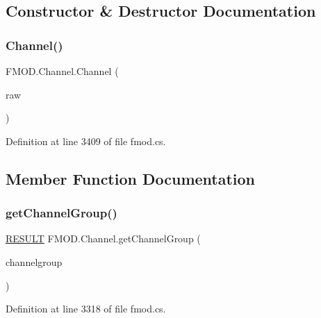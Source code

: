 \subsection{Constructor \& Destructor Documentation}
\mbox{\label{class_f_m_o_d_1_1_channel_a48f307ca43520fbdcc11a616507d6fde}} 
\subsubsection{\texorpdfstring{Channel()}{Channel()}}
{\footnotesize\ttfamily F\+M\+O\+D.\+Channel.\+Channel (\begin{DoxyParamCaption}\item[{Int\+Ptr}]{raw }\end{DoxyParamCaption})}



Definition at line 3409 of file fmod.\+cs.



\subsection{Member Function Documentation}
\mbox{\label{class_f_m_o_d_1_1_channel_a6090d298a16a30059959c2e62939ba25}} 
\subsubsection{\texorpdfstring{get\+Channel\+Group()}{getChannelGroup()}}
{\footnotesize\ttfamily \hyperlink{namespace_f_m_o_d_a305d1176ef3f8c8815861a60407ac33d}{R\+E\+S\+U\+LT} F\+M\+O\+D.\+Channel.\+get\+Channel\+Group (\begin{DoxyParamCaption}\item[{out \hyperlink{class_f_m_o_d_1_1_channel_group}{Channel\+Group}}]{channelgroup }\end{DoxyParamCaption})}



Definition at line 3318 of file fmod.\+cs.

\mbox{\label{class_f_m_o_d_1_1_channel_a27a165d8a508e68191a8a544bb310aba}} 
